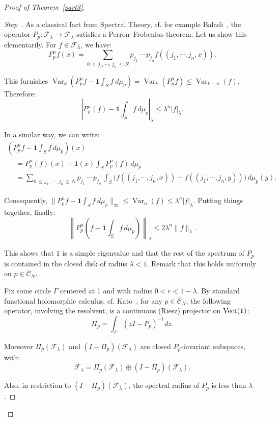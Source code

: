 \documentclass[10pt]{amsart}
\theoremstyle{definition}\newtheorem{defi}[theo]{Definition}\newtheorem{rema}[theo]{Remark}\newtheorem{exam}[theo]{Example}\newtheorem{exem}[theo]{Example}\newtheorem{nota}[theo]{Notation}
\newcommand{\Ccl}{\mathcal{C}}
\newcommand{\Fcl}{\mathcal{F}}
\newcommand{\bfun}{\mathbf{1}}
\DeclareMathOperator{\Var}{Var}
\DeclareMathOperator{\Vect}{Vect}
\newcounter{stepcount}
\newenvironment{step}{\refstepcounter{stepcount}\begin{proof}[Step~\thestepcount]}{\let\qed\relax\end{proof}}
\begin{document}
\begin{proof}[{Proof of Theorem~\ref{part3}}]
\begin{step}
As a classical fact from Spectral Theory, cf. for example Baladi~\cite{baladi}, the operator $P_p:{\Fcl}_{\lambda}\rightarrow{\Fcl}_{\lambda}$ satisfies a Perron--Frobenius theorem. Let us show this elementarily. For $f\in{\Fcl}_{\lambda}$, we have:
\[
P^n_pf(x)=\sum_{0\,\leq\,j_1,\,\cdots,\,j_n\,\leq\,N}p_{j_1}\,\cdots\,p_{j_n}f((j_1,\cdots,j_n,x)).
\]


This furnishes $\Var_k(P^n_pf-\bfun\int_Sf~d\mu_p)=\Var_k(P^n_pf)\leq\Var_{k+n}(f)$. Therefore:
\[
\left|{P^n_p(f)-\bfun\int_Sf\,d\mu_p}\right|_{\lambda}\leq \lambda^n|f|_{\lambda}.
\]



In a similar way, we can write:
\begin{multline*}
\left(P^n_pf-\bfun\int_Sf\,d\mu_p\right)(x)\\
\begin{aligned}
&=P^n_p(f)(x)-\bfun(x)\int_SP_p^n(f)\,d\mu_p\\
&=\sum_{0\,\leq\,j_1,\,\cdots,\,j_n\,\leq\,N}p_{j_1}\,\cdots\,p_{j_n}\,\int_S\big(f((j_1,\cdots,j_n,x))-f((j_1,\cdots,j_n,y))\big)\,d\mu_p(y).
\end{aligned}
\end{multline*}


Consequently, $\|P^n_pf-\bfun\int_Sf~d\mu_p\|_{\infty}\leq \Var_n(f)\leq\lambda^n|f|_{\lambda}$. Putting things together, finally:
\[
\left\|P^n_p\left(f-\bfun\int_Sf\,d\mu_p\right)\right\|_{\lambda}\leq 2\lambda^n\|f\|_{\lambda}.
\]


This shows that $1$ is a simple eigenvalue and that the rest of the spectrum of $P_p$ is contained in the closed disk of radius $\lambda<1$. Remark that this holds uniformly on $p\in\bar{\Ccl}_N$.




Fix some circle $\Gamma$ centered at 1 and with radius $0<r<1-\lambda$. By standard functional holomorphic calculus, cf. Kato~\cite{kato}, for any $p\in\bar{\Ccl}_N$, the following operator, involving the resolvent, is a continuous (Riesz) projector on $\Vect({\bf1})$:
\begin{equation}\label{proj}
\Pi_p=\int_{\Gamma}\left(zI-P_p\right)^{-1}dz.
\end{equation}

Moreover $\Pi_p({\Fcl}_{\lambda})$ and $(I-\Pi_p)({\Fcl}_{\lambda})$ are closed $P_p$-invariant subspaces, with:
\[
{\Fcl}_{\lambda}=\Pi_p({\Fcl}_{\lambda})\oplus(I-\Pi_p)({\Fcl}_{\lambda}).
\]

Also, in restriction to $(I-\Pi_p)({\Fcl}_{\lambda})$, the spectral radius of $P_p$ is less than $\lambda$.



\end{step}
\end{proof}
\end{document}

